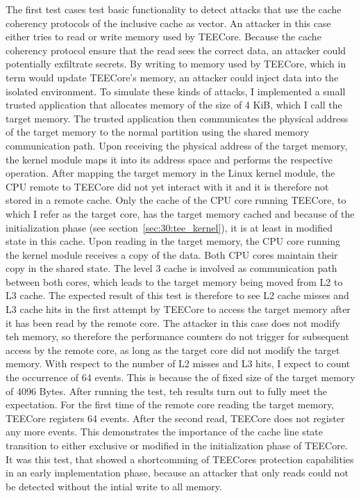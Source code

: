 The first test cases test basic functionality to detect attacks that use the
cache coherency protocols of the inclusive cache as vector. An attacker in this
case either tries to read or write memory used by TEECore. Because the cache
coherency protocol ensure that the read sees the correct data, an attacker could
potentially exfiltrate secrets. By writing to memory used by TEECore, which in
term would update TEECore's memory, an attacker could inject data into the
isolated environment. To simulate these kinds of attacks, I implemented a small
trusted application that allocates memory of the size of 4 KiB, which I call the
target memory. The trusted application then communicates the physical address of
the target memory to the normal partition using the shared memory communication
path. Upon receiving the physical address of the target memory, the kernel
module maps it into its address space and performs the respective operation.
After mapping the target memory in the Linux kernel module, the CPU remote to
TEECore did not yet interact with it and it is therefore not stored in a remote
cache. Only the cache of the CPU core running TEECore, to which I refer as the
target core, has the target memory cached and because of the initialization
phase (see section~\ref{sec:30:tee_kernel}), it is at least in modified state in
this cache. Upon reading in the target memory, the CPU core running the kernel
module receives a copy of the data. Both CPU cores maintain their copy in the
shared state. The level 3 cache is involved as communication path between both
cores, which leads to the target memory being moved from L2 to L3 cache. The
expected result of this test is therefore to see L2 cache misses and L3 cache
hits in the first attempt by TEECore to access the target memory after it has
been read by the remote core. The attacker in this case does not modify teh
memory, so therefore the performance counters do not trigger for subsequent
access by the remote core, as long as the target core did not modify the target
memory. With respect to the number of L2 misses and L3 hits, I expect to count
the occurrence of 64 events. This is because the of fixed size of the target
memory of 4096 Bytes. After running the test, teh results turn out to fully meet
the expectation. For the first time of the remote core reading the target
memory, TEECore registers 64 events. After the second read, TEECore does not
register any more events. This demonstrates the importance of the cache line
state transition to either exclusive or modified in the initialization phase of
TEECore. It was this test, that showed a shortcomming of TEECores protection
capabilities in an early implementation phase, because an attacker that only
reads could not be detected without the intial write to all memory.\\

